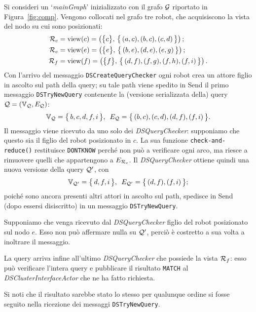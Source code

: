\begin{example}
Si consideri un `\emph{mainGraph}' inizializzato con il
grafo $\mathcal{G}$ riportato in Figura~\ref{fig:comp}.
Vengono collocati nel grafo tre robot, che acquisiscono
la vista del nodo su cui sono posizionati:
\begin{align*}
  \mathcal{R}_c &= \mathrm{view}(c) = \left(\bigl\{c\bigr\},\,
  \bigl\{\,(a,c), (b,c), (c,d)\,\bigr\}\right); \\
  \mathcal{R}_e &= \mathrm{view}(e) = \left(\bigl\{e\bigr\},\,
  \bigl\{\,(b,e), (d,e), (e,g)\,\bigr\}\right); \\
  \mathcal{R}_f &= \mathrm{view}(f) = \left(\bigl\{f\bigr\},\,
  \bigl\{\,(d,f), (f,g), (f,h), (f,i)\,\bigr\}\right).
\end{align*}
Con l'arrivo del messaggio \texttt{DSCreateQueryChecker}
ogni robot crea un attore figlio in ascolto sul path
della query; su tale path viene spedito in Send il primo
messaggio \texttt{DSTryNewQuery} contenente la (versione
serializzata della) query $\mathcal{Q} = (\mathbb{V}_{\mathcal{Q}}, E_{\mathcal{Q}})$:\[
\mathbb{V}_{\mathcal{Q}} = \bigl\{\,b, c, d, f, i\,\bigr\}, \ \,
E_{\mathcal{Q}} = \bigl\{\,(b,c),(c,d),(d,f),(f,i)\,\bigr\}.\]
Il messaggio viene ricevuto da uno solo dei
\emph{DSQueryChecker}: supponiamo che questo sia il figlio
del robot posizionato in $c$.
La sua funzione \texttt{check-and-reduce()} restituisce
\texttt{DONTKNOW} perché non può a verificare ogni
arco, ma riesce a rimuovere quelli che appartengono a $E_{\mathcal{R}_c}$.
Il \emph{DSQueryChecker} ottiene quindi una nuova versione
della query $\mathcal{Q}'$, con\[
\mathbb{V}_{\mathcal{Q}'} = \bigl\{\,d, f, i\,\bigr\}, \ \,
E_{\mathcal{Q}'} = \bigl\{\,(d,f),(f,i)\,\bigr\};\]
poiché sono ancora presenti altri attori in ascolto sul path,
spedisce in Send (dopo essersi disiscritto)
in un messaggio \texttt{DSTryNewQuery}.

Supponiamo che venga ricevuto dal \emph{DSQueryChecker}
figlio del robot posizionato sul nodo $e$.
Esso non può affermare nulla su $\mathcal{Q}'$, perciò è
costretto a sua volta a inoltrare il messaggio.

La query arriva infine all'ultimo \emph{DSQueryChecker} che
possiede la vista $\mathcal{R}_f$: esso può verificare l'intera query
e pubblicare il risultato \texttt{MATCH} al
\emph{DSClusterInterfaceActor} che ne ha fatto richiesta.

Si noti che il risultato sarebbe stato lo stesso per
qualunque ordine si fosse seguito nella ricezione dei messaggi
\texttt{DSTryNewQuery}.
\end{example}
